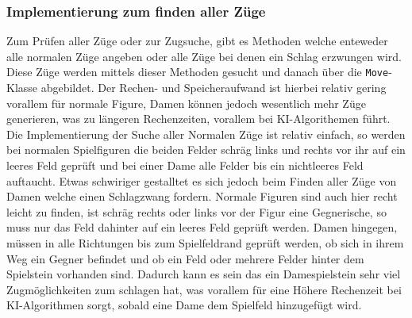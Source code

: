 \documentclass[12pt,a4paper,bibliography=totocnumbered,listof=totocnumbered]{article}
\begin{document}
\subsubsection{Implementierung zum finden aller Züge}
Zum Prüfen aller Züge oder zur Zugsuche, gibt es Methoden welche enteweder alle normalen Züge angeben oder alle Züge bei denen ein Schlag erzwungen wird. 
Diese Züge werden mittels dieser Methoden gesucht und danach über die \texttt{Move}-Klasse abgebildet. Der Rechen- und Speicheraufwand ist hierbei relativ gering 
vorallem für normale Figure, Damen können jedoch wesentlich mehr Züge generieren, was zu längeren Rechenzeiten, vorallem bei KI-Algorithemen führt.
\\
Die Implementierung der Suche aller Normalen Züge ist relativ einfach, so werden bei normalen Spielfiguren die beiden Felder schräg links und rechts vor ihr 
auf ein leeres Feld geprüft und bei einer Dame alle Felder bis ein nichtleeres Feld auftaucht. Etwas schwiriger gestalltet es sich jedoch beim Finden aller 
Züge von Damen welche einen Schlagzwang fordern. Normale Figuren sind auch hier recht leicht zu finden, ist schräg rechts oder links vor der Figur 
eine Gegnerische, so muss nur das Feld dahinter auf ein leeres Feld geprüft werden. Damen hingegen, müssen in alle Richtungen bis zum Spielfeldrand 
geprüft werden, ob sich in ihrem Weg ein Gegner befindet und ob ein Feld oder mehrere Felder hinter dem Spielstein vorhanden sind. Dadurch kann es sein das ein 
Damespielstein sehr viel Zugmöglichkeiten zum schlagen hat, was vorallem für eine Höhere Rechenzeit bei KI-Algorithmen sorgt, sobald eine Dame dem Spielfeld hinzugefügt wird.
\end{document}
